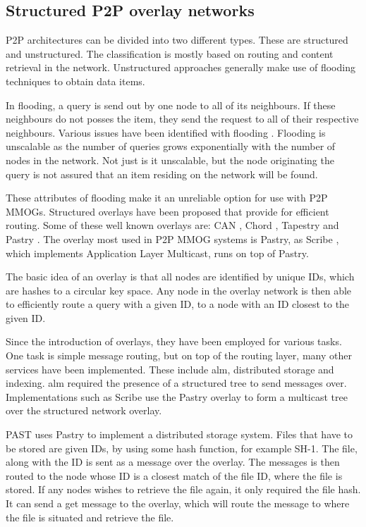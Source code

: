 \documentclass[journal,oneside,a4paper,onecolumn]{IEEEtran}
\begin{document}
\subsection{Structured P2P overlay networks}
\label{overlays}

P2P architectures can be divided into two different types. These are structured and unstructured. The classification is mostly based on routing and content retrieval in the network. Unstructured approaches generally make use of flooding techniques to obtain data items.

In flooding, a query is send out by one node to all of its neighbours. If these neighbours do not posses the item, they send the request to all of their respective neighbours. Various issues have been identified with flooding \cite{overlay_scalable_alternative}. Flooding is unscalable as the number of queries grows exponentially with the number of nodes in the network. Not just is it unscalable, but the node originating the query is not assured that an item residing on the network will be found.

These attributes of flooding make it an unreliable option for use with P2P MMOGs. Structured overlays have been proposed that provide for efficient routing. Some of these well known overlays are: CAN \cite{CAN}, Chord \cite{chord}, Tapestry \cite{tapestry} and Pastry \cite{pastry}. The overlay most used in P2P MMOG systems is Pastry, as Scribe \cite{scribe}, which implements Application Layer Multicast, runs on top of Pastry.

The basic idea of an overlay is that all nodes are identified by unique IDs, which are hashes to a circular key space. Any node in the overlay network is then able to efficiently route a query with a given ID, to a node with an ID closest to the given ID.

Since the introduction of overlays, they have been employed for various tasks. One task is simple message routing, but on top of the routing layer, many other services have been implemented. These include \ac{alm}, distributed storage \cite{past_storage_focus} and indexing. \ac{alm} required the presence of a structured tree to send messages over. Implementations such as Scribe use the Pastry overlay to form a multicast tree over the structured network overlay.

PAST \cite{past_storage_focus} uses Pastry to implement a distributed storage system. Files that have to be stored are given IDs, by using some hash function, for example SH-1. The file, along with the ID is sent as a message over the overlay. The messages is then routed to the node whose ID is a closest match of the file ID, where the file is stored. If any nodes wishes to retrieve the file again, it only required the file hash. It can send a get message to the overlay, which will route the message to where the file is situated and retrieve the file.
\end{document}
